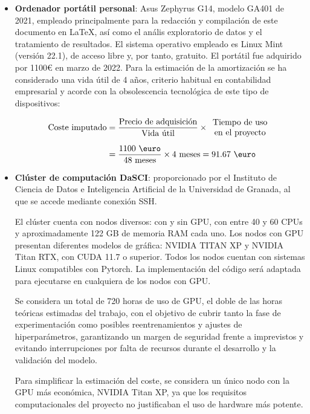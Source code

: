 \begin{itemize}
    \item \textbf{Ordenador portátil personal}: Asus Zephyrus G14, modelo GA401 de 2021, empleado principalmente para la redacción y compilación de este documento en \LaTeX, así como el anális exploratorio de datos y el tratamiento de resultados. El sistema operativo empleado es Linux Mint (versión 22.1), de acceso libre y, por tanto, gratuito. El portátil fue adquirido por 1100\euro{} en marzo de 2022. Para la estimación de la amortización se ha considerado una vida útil de 4 años, criterio habitual en contabilidad empresarial y acorde con la obsolescencia tecnológica de este tipo de dispositivos:

    \begin{align*}
    \text{Coste imputado} 
    &= \frac{\text{Precio de adquisición}}{\text{Vida útil}} \times 
    \begin{array}{c}
        \text{Tiempo de uso} \\ 
        \text{en el proyecto}
    \end{array} \\[1ex]
    &= \frac{1100 \text{ \euro}}{48 \text{ meses}} \times 4 \text{ meses} = 91.67 \text{ \euro}
    \end{align*}

    \item \textbf{Clúster de computación DaSCI}: proporcionado por el Instituto de Ciencia de Datos e Inteligencia Artificial de la Universidad de Granada, al que se accede mediante conexión SSH. 
    
    El clúster cuenta con nodos diversos: con y sin GPU, con entre 40 y 60 CPUs y aproximadamente 122 GB de memoria RAM cada uno. Los nodos con GPU presentan diferentes modelos de gráfica: NVIDIA TITAN XP y NVIDIA Titan RTX, con CUDA 11.7 o superior. Todos los nodos cuentan con sistemas Linux compatibles con Pytorch.
    La implementación del código será adaptada para ejecutarse en cualquiera de los nodos con GPU. 

    Se considera un total de 720 horas de uso de GPU, el doble de las horas teóricas estimadas del trabajo, con el objetivo de cubrir tanto la fase de experimentación como posibles reentrenamientos y ajustes de hiperparámetros, garantizando un margen de seguridad frente a imprevistos y evitando interrupciones por falta de recursos durante el desarrollo y la validación del modelo.

    Para simplificar la estimación del coste, se considera un único nodo con la GPU más económica, NVIDIA Titan XP, ya que los requisitos computacionales del proyecto no justificaban el uso de hardware más potente.  
    

\end{itemize}
